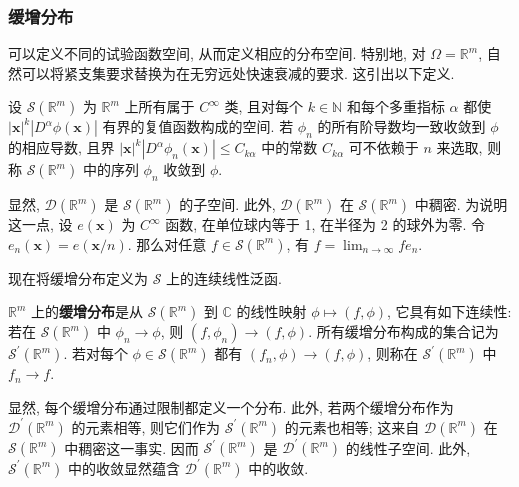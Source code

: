 \subsubsection{缓增分布}\label{subsec:tempered-distributions}

可以定义不同的试验函数空间, 从而定义相应的分布空间. 特别地, 对 $\Omega=\mathbb{R}^m$, 自然可以将紧支集要求替换为在无穷远处快速衰减的要求. 这引出以下定义.

\begin{Definition}
\label{def:rapidly-decreasing-test-space}
设 $\mathcal{S}(\mathbb{R}^m)$ 为 $\mathbb{R}^m$ 上所有属于 $C^\infty$ 类, 且对每个 $k\in\mathbb{N}$ 和每个多重指标 $\alpha$ 都使 $|\bm{x}|^k|D^\alpha\phi(\bm{x})|$ 有界的复值函数构成的空间. 若 $\phi_n$ 的所有阶导数均一致收敛到 $\phi$ 的相应导数, 且界 $|\bm{x}|^k|D^\alpha\phi_n(\bm{x})|\leq C_{k\alpha}$ 中的常数 $C_{k\alpha}$ 可不依赖于 $n$ 来选取, 则称 $\mathcal{S}(\mathbb{R}^m)$ 中的序列 $\phi_n$ 收敛到 $\phi$.
\end{Definition}

显然, $\mathcal{D}(\mathbb{R}^m)$ 是 $\mathcal{S}(\mathbb{R}^m)$ 的子空间. 此外, $\mathcal{D}(\mathbb{R}^m)$ 在 $\mathcal{S}(\mathbb{R}^m)$ 中稠密. 为说明这一点, 设 $e(\bm{x})$ 为 $C^\infty$ 函数, 在单位球内等于 1, 在半径为 2 的球外为零. 令 $e_n(\bm{x})=e(\bm{x}/n)$. 那么对任意 $f\in\mathcal{S}(\mathbb{R}^m)$, 有 $f=\lim_{n\to\infty}fe_n$.

现在将缓增分布定义为 $\mathcal{S}$ 上的连续线性泛函.

\begin{Definition}
\label{def:tempered-distribution}
$\mathbb{R}^m$ 上的\textbf{缓增分布}是从 $\mathcal{S}(\mathbb{R}^m)$ 到 $\mathbb{C}$ 的线性映射 $\phi\mapsto(f,\phi)$, 它具有如下连续性: 若在 $\mathcal{S}(\mathbb{R}^m)$ 中 $\phi_n\to\phi$, 则 $(f,\phi_n)\to(f,\phi)$. 所有缓增分布构成的集合记为 $\mathcal{S}^{\prime}(\mathbb{R}^m)$. 若对每个 $\phi\in\mathcal{S}(\mathbb{R}^m)$ 都有 $(f_n,\phi)\to(f,\phi)$, 则称在 $\mathcal{S}^{\prime}(\mathbb{R}^m)$ 中 $f_n\to f$.
\end{Definition}

显然, 每个缓增分布通过限制都定义一个分布. 此外, 若两个缓增分布作为 $\mathcal{D}^{\prime}(\mathbb{R}^m)$ 的元素相等, 则它们作为 $\mathcal{S}^{\prime}(\mathbb{R}^m)$ 的元素也相等; 这来自 $\mathcal{D}(\mathbb{R}^m)$ 在 $\mathcal{S}(\mathbb{R}^m)$ 中稠密这一事实. 因而 $\mathcal{S}^{\prime}(\mathbb{R}^m)$ 是 $\mathcal{D}^{\prime}(\mathbb{R}^m)$ 的线性子空间. 此外, $\mathcal{S}^{\prime}(\mathbb{R}^m)$ 中的收敛显然蕴含 $\mathcal{D}^{\prime}(\mathbb{R}^m)$ 中的收敛.
